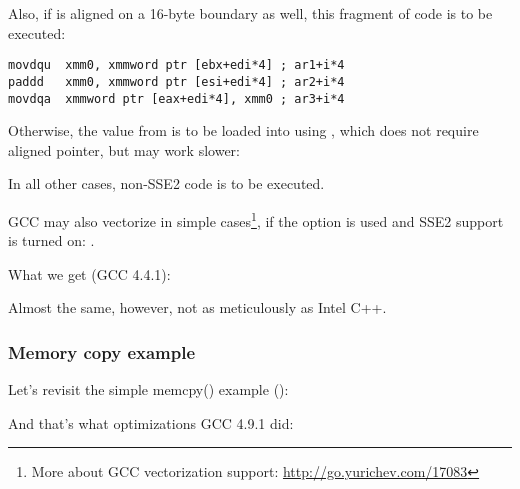 Also, if  is aligned on a 16-byte boundary as well, 
this fragment of code is to be executed:

\begin{lstlisting}[style=customasmx86]
movdqu  xmm0, xmmword ptr [ebx+edi*4] ; ar1+i*4
paddd   xmm0, xmmword ptr [esi+edi*4] ; ar2+i*4
movdqa  xmmword ptr [eax+edi*4], xmm0 ; ar3+i*4
\end{lstlisting}

Otherwise, the value from  is to be loaded into  using \MOVDQU,
which does not require aligned pointer, but may work slower:



In all other cases, non-SSE2 code is to be executed.


\newcommand{\URLGCCVEC}{\url{http://go.yurichev.com/17083}}

GCC may also vectorize in simple cases\footnote{More about GCC vectorization support: \URLGCCVEC},
if the \Othree option is used and SSE2 support is turned on: .

What we get (GCC 4.4.1):



Almost the same, however, not as meticulously as Intel C++.

\subsubsection{Memory copy example}
\label{vec_memcpy}

Let's revisit the simple memcpy() example
():



And that's what optimizations GCC 4.9.1 did:


